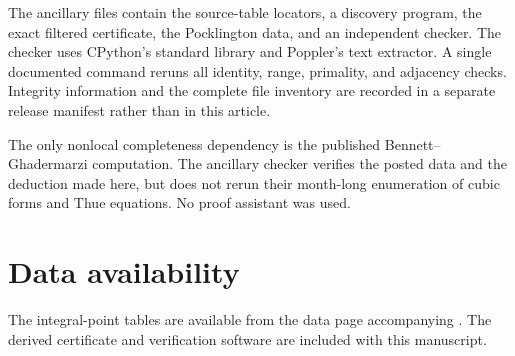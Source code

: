 \documentclass[11pt]{amsart}
\theoremstyle{remark}
\begin{document}
The ancillary files contain the source-table locators, a discovery program,
the exact filtered certificate, the Pocklington data, and an independent
checker.  The checker uses CPython's standard library and Poppler's text
extractor.  A single documented command reruns all identity, range,
primality, and adjacency checks.  Integrity information and the complete
file inventory are recorded in a separate release manifest rather than in
this article.

The only nonlocal completeness dependency is the published
Bennett--Ghadermarzi computation.  The ancillary checker verifies the posted
data and the deduction made here, but does not rerun their month-long
enumeration of cubic forms and Thue equations.  No proof assistant was used.

\section*{Data availability}

The integral-point tables are available from the data page accompanying
\cite{BennettGhadermarzi2015}.  The derived certificate and verification
software are included with this manuscript.



\end{document}
